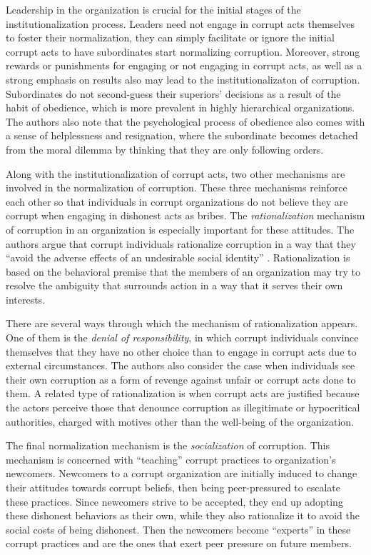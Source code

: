 \documentclass[12pt,a4]{article}\usepackage[]{graphicx}\usepackage[]{xcolor}
\begin{document}
Leadership in the organization is crucial for the initial stages of the institutionalization process. Leaders need not engage in corrupt acts themselves to foster their normalization, they can simply facilitate or ignore the initial corrupt acts to have subordinates start normalizing corruption. Moreover, strong rewards or punishments for engaging or not engaging in corrupt acts, as well as a strong emphasis on results also may lead to the institutionalizaton of corruption. Subordinates do not second-guess their superiors' decisions as a result of the habit of obedience, which is more prevalent in highly hierarchical organizations. The authors also note that the psychological process of obedience also comes with a sense of helplessness and resignation, where the subordinate becomes detached from the moral dilemma by thinking that they are only following orders. 

Along with the institutionalization of corrupt acts, two other mechanisms are involved in the normalization of corruption. These three mechanisms reinforce each other so that individuals in corrupt organizations do not believe they are corrupt when engaging in dishonest acts as bribes. The \textit{rationalization} mechanism of corruption in an organization is especially important for these attitudes. The authors argue that corrupt individuals rationalize corruption in a way that they \enquote{avoid the adverse effects of an undesirable social identity} \parencite[p.13]{Ashforth.2003}. Rationalization is based on the behavioral premise that the members of an organization may try to resolve the ambiguity that surrounds action in a way that it serves their own interests. 

There are several ways through which the mechanism of rationalization appears. One of them is the \textit{denial of responsibility}, in which corrupt individuals convince themselves that they have no other choice than to engage in corrupt acts due to external circumstances. The authors also consider the case when individuals see their own corruption as a form of revenge against unfair or corrupt acts done to them. A related type of rationalization is when corrupt acts are justified because the actors perceive those that denounce corruption as illegitimate or hypocritical authorities, charged with motives other than the well-being of the organization.

The final normalization mechanism is the \textit{socialization} of corruption. This mechanism is concerned with \enquote{teaching} corrupt practices to organization's newcomers. Newcomers to a corrupt organization are initially induced to change their attitudes towards corrupt beliefs, then being peer-pressured to escalate these practices. Since newcomers strive to be accepted, they end up adopting these dishonest behaviors as their own, while they also rationalize it to avoid the social costs of being dishonest. Then the newcomers become \enquote{experts} in these corrupt practices and are the ones that exert peer pressure on future members.
\end{document}
